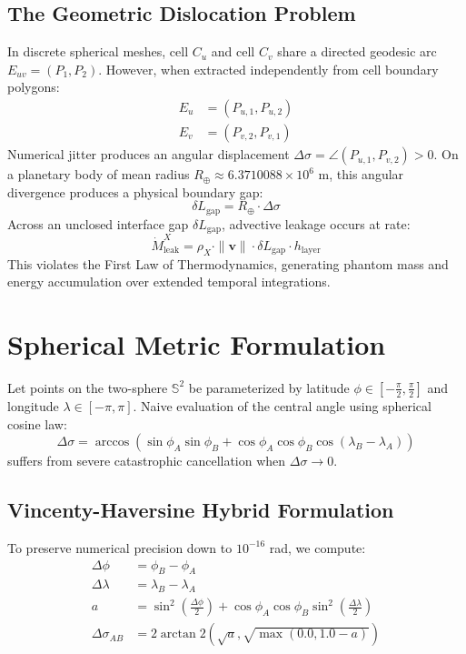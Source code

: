 \documentclass[11pt,a4paper]{article}
\begin{document}
\subsection{The Geometric Dislocation Problem}
In discrete spherical meshes, cell $C_u$ and cell $C_v$ share a directed geodesic arc $E_{uv} = (P_1, P_2)$. However, when extracted independently from cell boundary polygons:
\begin{align}
E_{u} &= (P_{u, 1}, P_{u, 2}) \\
E_{v} &= (P_{v, 2}, P_{v, 1})
\end{align}
Numerical jitter produces an angular displacement $\Delta\sigma = \angle(P_{u,1}, P_{v,2}) > 0$. On a planetary body of mean radius $R_{\oplus} \approx 6.3710088 \times 10^6 \text{ m}$, this angular divergence produces a physical boundary gap:
\begin{equation}
\delta L_{\text{gap}} = R_{\oplus} \cdot \Delta\sigma
\end{equation}
Across an unclosed interface gap $\delta L_{\text{gap}}$, advective leakage occurs at rate:
\begin{equation}
\dot{M}_{\text{leak}}^X = \rho_X \cdot \|\mathbf{v}\| \cdot \delta L_{\text{gap}} \cdot h_{\text{layer}}
\end{equation}
This violates the First Law of Thermodynamics, generating phantom mass and energy accumulation over extended temporal integrations.

\section{Spherical Metric Formulation}

Let points on the two-sphere $\mathbb{S}^2$ be parameterized by latitude $\phi \in [-\frac{\pi}{2}, \frac{\pi}{2}]$ and longitude $\lambda \in [-\pi, \pi]$. Naive evaluation of the central angle using spherical cosine law:
\begin{equation}
\Delta\sigma = \arccos\left(\sin\phi_A \sin\phi_B + \cos\phi_A \cos\phi_B \cos(\lambda_B - \lambda_A)\right)
\end{equation}
suffers from severe catastrophic cancellation when $\Delta\sigma \to 0$.

\subsection{Vincenty-Haversine Hybrid Formulation}
To preserve numerical precision down to $10^{-16}$ rad, we compute:
\begin{align}
\Delta\phi &= \phi_B - \phi_A \\
\Delta\lambda &= \lambda_B - \lambda_A \\
a &= \sin^2\left(\frac{\Delta\phi}{2}\right) + \cos\phi_A \cos\phi_B \sin^2\left(\frac{\Delta\lambda}{2}\right) \\
\Delta\sigma_{AB} &= 2 \arctan2\left(\sqrt{a}, \sqrt{\max(0.0, 1.0 - a)}\right)
\end{align}
\end{document}
